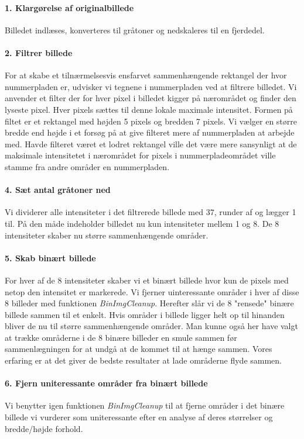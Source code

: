 \paragraph{1. Klargørelse af originalbillede}
Billedet indlæses, konverteres til gråtoner og nedskaleres til en fjerdedel. 

\paragraph{2. Filtrer billede}
For at skabe et tilnærmelsesvis ensfarvet sammenhængende rektangel der hvor nummerpladen er, udvisker vi tegnene i nummerpladen ved at filtrere billedet. Vi anvender et filter der for hver pixel i billedet kigger på nærområdet og finder den lyseste pixel. Hver pixels sættes til denne lokale maximale intensitet. Formen på filtet er et rektangel med højden 5 pixels og bredden 7 pixels. Vi vælger en større bredde end højde i et forsøg på at give filteret mere af  nummerpladen at arbejde med. Havde filteret været et lodret rektangel ville det være mere sansynligt at de maksimale intensitetet i nærområdet for pixels i nummerpladeområdet ville stamme fra andre områder en nummerpladen.

\paragraph{4. Sæt antal gråtoner ned}
Vi dividerer alle intensiteter i det filtrerede billede med $37$, runder af og lægger 1 til. På den måde indeholder billedet nu kun intensiteter mellem 1 og 8. De 8 intensiteter skaber nu større sammenhængende områder.  

\paragraph{5. Skab binært billede}
For hver af de 8 intensiteter skaber vi et binært billede hvor kun de pixels med netop den intensitet er markerede. Vi fjerner uinteressante områder i hver af disse 8 billeder med funktionen \textit{BinImgCleanup}. Herefter slår vi de 8 "rensede" binære billede sammen til et enkelt. Hvis områder i billede ligger helt op til hinanden bliver de nu til større sammenhængende områder. Man kunne også her have valgt at trække områderne i de 8 binære billeder en smule sammen før sammenlægningen for at undgå at de kommet til at hænge sammen. Vores erfaring er at det giver de bedste resultater at lade områderne flyde sammen.   

\paragraph{6. Fjern uniteressante områder fra binært billede}
Vi benytter igen funktionen \textit{BinImgCleanup} til at fjerne områder i det binære billede vi vurderer som uniteressante efter en analyse af deres størrelser og bredde/højde forhold.

